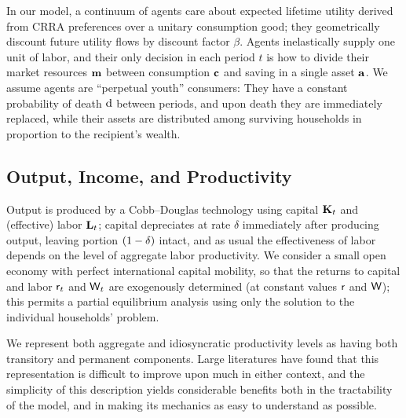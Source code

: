 \documentclass[titlepage]{./econtex}
\begin{document}
In our model, a continuum of agents care about expected lifetime utility derived from CRRA preferences over a unitary consumption good; they geometrically discount future utility flows by discount factor $\beta$.  Agents inelastically supply one unit of labor, and their only decision in each period $t$ is how to divide their market resources $\mathbf{m}$ between consumption $\mathbf{c}$ and saving in a single asset $\mathbf{a}$.  We assume agents are \cite{blanchardFinite} ``perpetual youth'' consumers: They have a constant probability of death $\mathrm{d}$ between periods, and upon death they are immediately replaced, while their assets are distributed among surviving households in proportion to the recipient's wealth.

\subsection{Output, Income, and Productivity}

Output is produced by a Cobb--Douglas technology using capital $\mathbf{K}_t$ and (effective) labor $\mathbf{L}_t$; capital depreciates at rate $\delta$ immediately after producing output, leaving portion $(1-\delta)$ intact, and as usual the effectiveness of labor depends on the level of aggregate labor productivity.  We consider a small open economy with perfect international capital mobility, so that the returns to capital and labor $\mathsf{r}_t$ and $\mathsf{W}_t$ are exogenously determined (at constant values $\mathsf{r}$ and $\mathsf{W}$); this permits a partial equilibrium analysis using only the solution to the individual households' problem. 

We represent both aggregate and idiosyncratic productivity levels as having both transitory and permanent components.  Large literatures have found that this representation is difficult to improve upon much in either context, and the simplicity of this description yields considerable benefits both in the tractability of the model, and in making its mechanics as easy to understand as possible.
\end{document}
